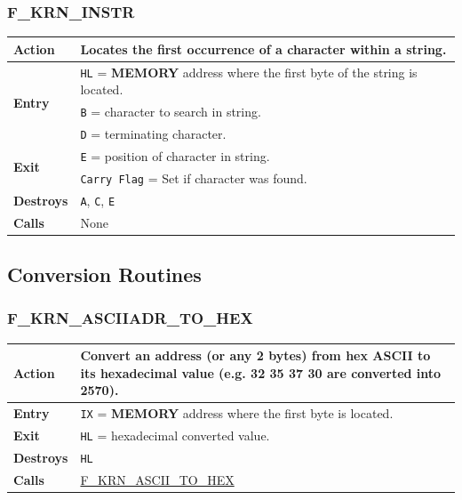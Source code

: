 \documentclass[a4paper,11pt]{article}
\begin{document}
        \subsubsection{F\_KRN\_INSTR}
        \label{func:fkrninstr}
        \begin{tabular}{l p{9cm}}
            \hline\textbf{Action}
            & Locates the first occurrence of a character within a string.\\
            \hline\multirow[t]{3}{4em}{\textbf{Entry}}
            & \texttt{HL} = \textbf{MEMORY} address where the first byte of the
            string is located.\\
            & \texttt{B} = character to search in string.\\
            & \texttt{D} = terminating character.\\
            \hline\multirow[t]{2}{4em}{\textbf{Exit}}
            & \texttt{E} = position of character in string.\\
            & \texttt{Carry Flag} = Set if character was found.\\
            \hline\textbf{Destroys} & \texttt{A}, \texttt{C}, \texttt{E}\\
            \hline\textbf{Calls} & None\\
            \hline
        \end{tabular}

    \subsection{Conversion Routines}

        \subsubsection{F\_KRN\_ASCIIADR\_TO\_HEX}
        \label{func:fkrnasciiadrtohex}
        \begin{tabular}{l p{9cm}}
            \hline\textbf{Action}
            & Convert an address (or any 2 bytes) from hex ASCII to its 
            hexadecimal value (e.g. 32 35 37 30 are converted into 2570).\\
            \hline\textbf{Entry} & \texttt{IX} = \textbf{MEMORY} address where
            the first byte is located.\\
            \hline\textbf{Exit} & \texttt{HL} = hexadecimal converted value.\\
            \hline\textbf{Destroys} & \texttt{HL}\\
            \hline\textbf{Calls}
            & \hyperref[func:fkrnasciitohex]{F\_KRN\_ASCII\_TO\_HEX}\\
            \hline
        \end{tabular}
\end{document}
